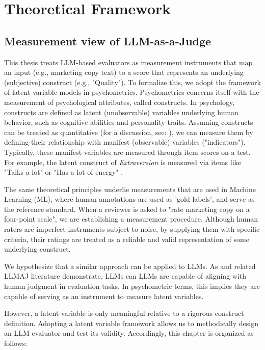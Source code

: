 
\section{Theoretical Framework}

\subsection{Measurement view of LLM-as-a-Judge}

This thesis treats LLM-based evaluators as measurement instruments that map an input (e.g., marketing copy text) to a score that represents an underlying (subjective) construct (e.g., "Quality"). To formalize this, we adopt the framework of latent variable models in psychometrics. Psychometrics concerns itself with the measurement of psychological attributes, called constructs. In psychology, constructs are defined as latent (unobservable) variables underlying human behavior, such as cognitive abilities and personality traits. Assuming constructs can be treated as quantitative (for a discussion, see: \citep{borsboom2003theoretical}), we can measure them by defining their relationship with manifest (observable) variables ("indicators"). Typically, these manifest variables are measured through item scores on a test. For example, the latent construct of \textit{Extraversion} is measured via items like "Talks a lot" or "Has a lot of energy" \citep{john1991big}. 

The same theoretical principles underlie measurements that are used in Machine Learning (ML), where human annotations are used as 'gold labels', and serve as the reference standard. When a reviewer is asked to "rate marketing copy on a four-point scale", we are establishing a measurement procedure. Although human raters are imperfect instruments subject to noise, by supplying them with specific criteria, their ratings are treated as a reliable and valid representation of some underlying construct. 

We hypothesize that a similar approach can be applied to LLMs. As \citet{zheng_judging_2023} and related LLMAJ literature demonstrate, LLMs can LLMs are capable of aligning with human judgment in evaluation tasks. In psychometric terms, this implies they are capable of serving as an instrument to measure latent variables.

However, a latent variable is only meaningful relative to a rigorous construct definition. Adopting a latent variable framework allows us to methodically design an LLM evaluator and test its validity. Accordingly, this chapter is organized as follows: 

